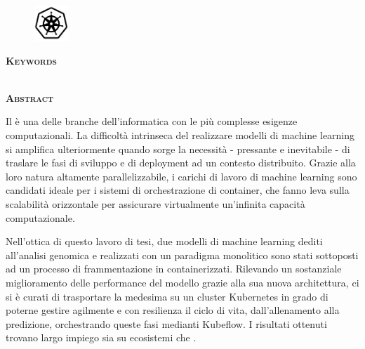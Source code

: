 % 
% 
% 

\newpage

\clearpage
\cleardoublepage
{}

\pagestyle{plain}


\begin{figure}
    \centering
    \includegraphics[width=50px]{figures/logos/k8s-bw-2.png}
    \label{fig:abstract:kubernetes}
\end{figure}

\begin{center}
    \large \textbf{\thesisTitle}
\end{center}

{\noindent \textbf{\textsc{Keywords}}}

{\noindent \thesisKeywords}\\


{\noindent \textbf{\textsc{Abstract}}}

\noindent Il  è una delle branche dell'informatica con le più complesse esigenze computazionali. La difficoltà intrinseca del realizzare modelli di machine learning si amplifica ulteriormente quando sorge la necessità - pressante e inevitabile - di traslare le fasi di sviluppo e di deployment ad un contesto distribuito. Grazie alla loro natura altamente parallelizzabile, i carichi di lavoro di machine learning sono candidati ideale per i sistemi di orchestrazione di container, che fanno leva sulla scalabilità orizzontale per assicurare virtualmente un'infinita capacità computazionale.

Nell'ottica di questo lavoro di tesi, due modelli di machine learning dediti all'analisi genomica e realizzati con un paradigma monolitico sono stati sottoposti ad un processo di frammentazione in  containerizzati. Rilevando un sostanziale miglioramento delle performance del modello grazie alla sua nuova architettura, ci si è curati di trasportare la medesima su un cluster Kubernetes in grado di poterne gestire agilmente e con resilienza il ciclo di vita, dall'allenamento alla predizione, orchestrando queste fasi medianti Kubeflow. I risultati ottenuti trovano largo impiego sia su ecosistemi \textit{} che \textit{}.

